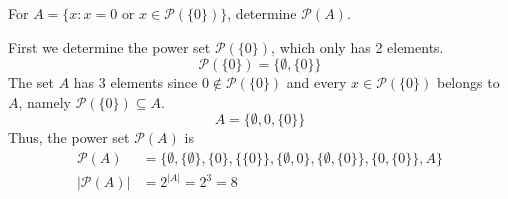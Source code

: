 \documentclass[12pt]{article}
\newenvironment{problem}[2][Problem]{\begin{trivlist}
		\item[\hskip \labelsep {\bfseries #1}\hskip \labelsep {\bfseries #2.}]}{\end{trivlist}}
\newenvironment{solution}[2][Solution]{\begin{trivlist}
		\item[\hskip \labelsep {\bfseries #1}\hskip \labelsep {\bfseries #2.}]}{\end{trivlist}}
\begin{document}
\begin{problem}{18}
	For $A=\{x:x=0 \text{ or } x \in \mathcal{P}(\{0\})\}$, determine $\mathcal{P}(A)$.
	\begin{solution}{}
		First we determine the power set $\mathcal{P}(\{0\})$, which only has 2 elements.
		\begin{equation*}
			\mathcal{P}(\{0\})=\{\emptyset,\{0\}\}
		\end{equation*}
		The set $A$ has 3 elements since $0\notin \mathcal{P}(\{0\})$ and every $x\in \mathcal{P}(\{0\})$ belongs to $A$, namely $\mathcal{P}(\{0\})\subseteq A$.
		\begin{equation*}
			A=\{\emptyset,0,\{0\}\}
		\end{equation*}
	Thus, the power set $\mathcal{P}(A)$ is
	\begin{align*}
		\mathcal{P}(A)&=\{\emptyset,\{\emptyset\},\{0\},\{\{0\}\},\{\emptyset,0\},\{\emptyset,\{0\}\},\{0,\{0\}\},A\}\\
		|\mathcal{P}(A)|&=2^{|A|}=2^{3}=8
	\end{align*}
	\end{solution}
\end{problem}
\end{document}
